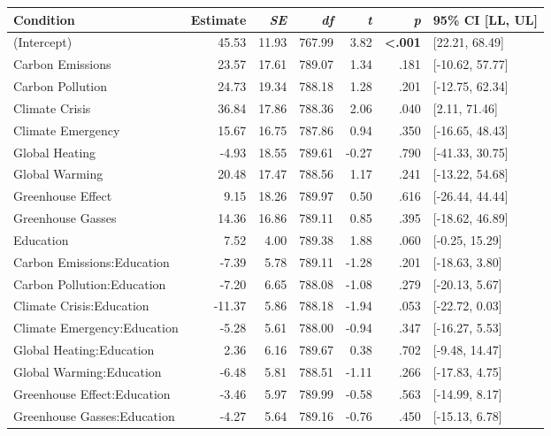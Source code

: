 \begin{table}[ht]
\centering
\begin{tabular}{lrrrrrl}
  \hline
Condition & Estimate & \textit{SE} & \textit{df} & \textit{t} & \textit{p} & 95\% CI [LL, UL] \\ 
  \hline
(Intercept) & 45.53 & 11.93 & 767.99 & 3.82 & \textbf{\textless  .001} & [22.21, 68.49] \\ 
  Carbon Emissions & 23.57 & 17.61 & 789.07 & 1.34 & .181 & [-10.62, 57.77] \\ 
  Carbon Pollution & 24.73 & 19.34 & 788.18 & 1.28 & .201 & [-12.75, 62.34] \\ 
  Climate Crisis & 36.84 & 17.86 & 788.36 & 2.06 & .040 & [2.11, 71.46] \\ 
  Climate Emergency & 15.67 & 16.75 & 787.86 & 0.94 & .350 & [-16.65, 48.43] \\ 
  Global Heating & -4.93 & 18.55 & 789.61 & -0.27 & .790 & [-41.33, 30.75] \\ 
  Global Warming & 20.48 & 17.47 & 788.56 & 1.17 & .241 & [-13.22, 54.68] \\ 
  Greenhouse Effect & 9.15 & 18.26 & 789.97 & 0.50 & .616 & [-26.44, 44.44] \\ 
  Greenhouse Gasses & 14.36 & 16.86 & 789.11 & 0.85 & .395 & [-18.62, 46.89] \\ 
  Education & 7.52 & 4.00 & 789.38 & 1.88 & .060 & [-0.25, 15.29] \\ 
  Carbon Emissions:Education & -7.39 & 5.78 & 789.11 & -1.28 & .201 & [-18.63, 3.80] \\ 
  Carbon Pollution:Education & -7.20 & 6.65 & 788.08 & -1.08 & .279 & [-20.13, 5.67] \\ 
  Climate Crisis:Education & -11.37 & 5.86 & 788.18 & -1.94 & .053 & [-22.72, 0.03] \\ 
  Climate Emergency:Education & -5.28 & 5.61 & 788.00 & -0.94 & .347 & [-16.27, 5.53] \\ 
  Global Heating:Education & 2.36 & 6.16 & 789.67 & 0.38 & .702 & [-9.48, 14.47] \\ 
  Global Warming:Education & -6.48 & 5.81 & 788.51 & -1.11 & .266 & [-17.83, 4.75] \\ 
  Greenhouse Effect:Education & -3.46 & 5.97 & 789.99 & -0.58 & .563 & [-14.99, 8.17] \\ 
  Greenhouse Gasses:Education & -4.27 & 5.64 & 789.16 & -0.76 & .450 & [-15.13, 6.78] \\ 
   \hline
\end{tabular}
\end{table}
